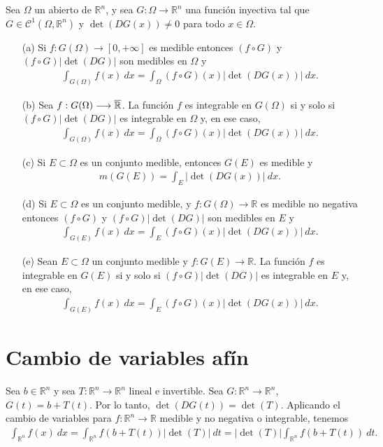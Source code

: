\begin{teo}
Sea $\Omega$ un abierto de $\mathbb{R}^n$, y sea $G: \Omega \longrightarrow \mathbb{R}^n$ una función inyectiva tal que $G \in \mathscr{C}^1(\Omega, \mathbb{R}^n)$ y $\det(DG(x)) \not = 0$ para todo $x \in \Omega$.
\begin{enumerate}
    \item[(a)] Si $f: G(\Omega) \longrightarrow [0,+\infty]$ es medible entonces $(f \circ G)$ y $(f \circ G)|\det(DG)|$ son medibles en $\Omega$ y
    \begin{align*}
        \int_{G(\Omega)}{f(x) \ dx} = \int_{\Omega}{(f \circ G)(x)|\det(DG(x))| \ dx}.
    \end{align*}
    \item[(b)] Sea $f: G(\Omega) \longrightarrow \overline{\mathbb{R}}$. La función $f$ es integrable en $G(\Omega)$ si y solo si $(f \circ G)|\det(DG)|$ es integrable en $\Omega$ y, en ese caso,
    \begin{align*}
        \int_{G(\Omega)}{f(x) \ dx} = \int_{\Omega}{(f \circ G)(x)|\det(DG(x))| \ dx}.
    \end{align*}
    \item[(c)] Si $E \subset \Omega$ es un conjunto medible, entonces $G(E)$ es medible y
    \begin{align*}
        m(G(E)) = \int_{E}{|\det(DG(x))| \ dx}.
    \end{align*}
    \item[(d)] Si $E \subset \Omega$ es un conjunto medible, y $f: G(\Omega) \longrightarrow \mathbb{R}$ es medible no negativa entonces $(f \circ G)$ y $(f \circ G)|\det(DG)|$ son medibles en $E$ y 
    \begin{align*}
        \int_{G(E)}{f(x) \ dx} = \int_{E}{(f \circ G)(x)|\det(DG(x))| \ dx}.
    \end{align*}
     \item[(e)] Sean $E \subset \Omega$ un conjunto medible y $f: G(E) \longrightarrow \mathbb{R}$. La función $f$ es integrable en $G(E)$ si y solo si $(f \circ G)|\det(DG)|$ es integrable en $E$ y, en ese caso,
    \begin{align*}
        \int_{G(E)}{f(x) \ dx} = \int_{E}{(f \circ G)(x)|\det(DG(x))| \ dx}.
    \end{align*}
\end{enumerate}
\end{teo}

\section{Cambio de variables afín}
Sea $b \in \mathbb{R}^n$ y sea $T: \mathbb{R}^n \longrightarrow \mathbb{R}^n$ lineal e invertible. Sea $G : \mathbb{R}^n \longrightarrow \mathbb{R}^n$, $G(t) = b + T(t)$. Por lo tanto, $\det(DG(t)) = \det(T)$. Aplicando el cambio de variables para $f: \mathbb{R}^n \longrightarrow \mathbb{R}$ medible y no negativa o integrable, tenemos
\begin{align*}
    \int_{\mathbb{R}^n}{f(x) \ dx} = \int_{\mathbb{R}^n}{f(b + T(t))|\det(T)| \ dt} = |\det(T)|\int_{\mathbb{R}^n}{f(b + T(t)) \ dt}.
\end{align*}

